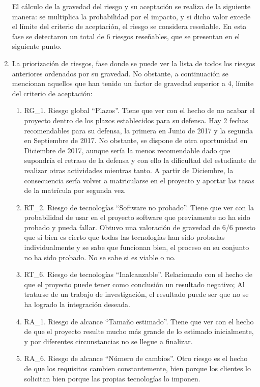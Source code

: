 \begin{enumerate}
\begin{enumerate}
\end{enumerate}
El cálculo de la gravedad del riesgo y su aceptación se realiza de la siguiente manera: se multiplica la probabilidad por el impacto, y si dicho valor excede el límite del criterio de aceptación, el riesgo se considera reseñable. En esta fase se detectaron un total de 6 riesgos reseñables, que se presentan en el siguiente punto.
\item La priorización de riesgos, fase donde se puede ver la lista de todos los riesgos anteriores ordenados por su gravedad. No obstante, a continuación se mencionan aquellos que han tenido un factor de gravedad superior a 4, límite del criterio de aceptación: 
\begin{enumerate}
\item RG\_1. Riesgo global “Plazos”. Tiene que ver con el hecho de no acabar el proyecto dentro de los plazos establecidos para su defensa. Hay 2 fechas recomendables para su defensa, la primera en Junio de 2017 y la segunda en Septiembre de 2017. No obstante, se dispone de otra oportunidad en Diciembre de 2017, aunque sería la menos recomendable dado que supondría el retraso de la defensa y con ello la dificultad del estudiante de realizar otras actividades mientras tanto. A partir de Diciembre, la consecuencia sería volver a matricularse en el proyecto y aportar las tasas de la matrícula por segunda vez.
\item RT\_2. Riesgo de tecnologías “Software no probado”. Tiene que ver con la probabilidad de usar en el proyecto software que previamente no ha sido probado y pueda fallar. Obtuvo una valoración de gravedad de 6/6 puesto que si bien es cierto que todas las tecnologías han sido probadas individualmente y se sabe que funcionan bien, el proceso en su conjunto no ha sido probado. No se sabe si es viable o no.  
\item RT\_6. Riesgo de tecnologías “Inalcanzable”. Relacionado con el hecho de que el proyecto puede tener como conclusión un resultado negativo; Al tratarse de un trabajo de investigación, el resultado puede ser que no se ha logrado la integración deseada.
\item RA\_1. Riesgo de alcance “Tamaño estimado”. Tiene que ver con el hecho de que el proyecto resulte mucho más grande de lo estimado inicialmente, y por diferentes circunstancias no se llegue a finalizar.
\item RA\_6. Riesgo de alcance “Número de cambios”. Otro riesgo es el hecho de que los requisitos cambien constantemente, bien porque los clientes lo solicitan bien porque las propias tecnologías lo imponen. 

\end{enumerate}
\end{enumerate}
